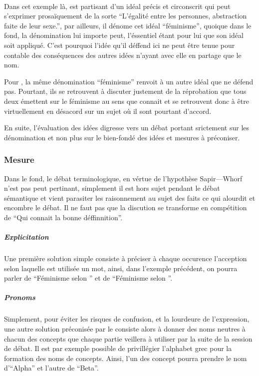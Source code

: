 \paragraph{}
Dans cet exemple là, \B est partisant d’un idéal précis et circonscrit qui peut s’exprimer prosaïquement de la sorte \enquote{L’égalité entre les personnes, abstraction faite de leur sexe.}, par ailleurs, il dénome cet idéal \enquote{féminisme}, quoique dans le fond, la dénomination lui importe peut, l’éssentiel étant pour lui que son idéal soit appliqué.
C’est pourquoi l’idée qu’il déffend ici ne peut être tenue pour contable des conséquences des autres idées n’ayant avec elle en partage que le nom.

Pour \A, la même dénomination \enquote{féminisme} renvoit à un autre idéal que \B ne défend pas. Pourtant, ils se retrouvent à discuter justement de la réprobation que tous deux émettent sur le féminisme au sens que connait \A et se retrouvent donc à être virtuellement en désacord sur un sujet où il sont pourtant d’accord.

En suite, l’évaluation des idées digresse vers un débat portant srictement sur les dénomination et non plus sur le bien-fondé des idées et mesures à préconiser.


\subsubsection{Mesure}
Dans le fond, le débat terminologique, en vértue de l’hypothèse Sapir—Whorf n’est pas peut pertinant, simplement il est hors sujet pendant le débat sémantique et vient parasiter les raisonnement au sujet des faits ce qui alourdit et encombre le débat. Il ne faut pas que la discution se transforme en compétition de \enquote{Qui connait la bonne déffinnition}.

\paragraph{}
\subparagraph{Explicitation}
Une première solution simple consiste à préciser à chaque occurence l’acception selon laquelle est utilisée un mot, ainsi, dans l’exemple précédent, on pourra parler de \enquote{Féminisme selon \A} et de \enquote{Féminisme selon \B}.

\subparagraph{Pronoms}
Simplement, pour éviter les risques de confusion, et la lourdeure de l’expression, une autre solution préconisée par le \mainabbr{} consiste alors à donner des noms neutres à chacun des concepts que chaque partie veillera à utiliser par la suite de la session de débat. Il est par exemple possible de privillégier l’alphabet grec pour la formation des noms de concepts. Ainsi, l’un des concept pourra prendre le nom d’\enquote{Alpha} et l’autre de \enquote{Beta}.

